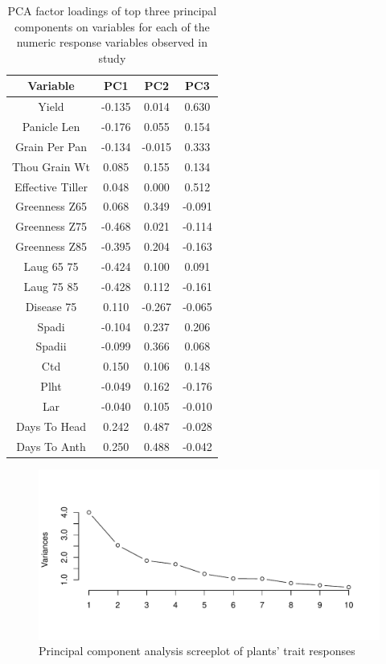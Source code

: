 \documentclass[12pt,oneside]{dukestatscithesis} %
\theoremstyle{definition}
\theoremstyle{definition}
\theoremstyle{definition}
\theoremstyle{remark}
\begin{document}
\begin{table}[H]

\caption{\label{tab:principal-component-loadings}PCA factor loadings of top three principal components on variables for each of the numeric response variables observed in study}
\centering
\fontsize{11}{13}\selectfont
\begin{tabular}[t]{cccc}
\toprule
\textbf{Variable} & \textbf{PC1} & \textbf{PC2} & \textbf{PC3}\\
\midrule
Yield & -0.135 & 0.014 & 0.630\\
Panicle Len & -0.176 & 0.055 & 0.154\\
Grain Per Pan & -0.134 & -0.015 & 0.333\\
Thou Grain Wt & 0.085 & 0.155 & 0.134\\
Effective Tiller & 0.048 & 0.000 & 0.512\\
Greenness Z65 & 0.068 & 0.349 & -0.091\\
Greenness Z75 & -0.468 & 0.021 & -0.114\\
Greenness Z85 & -0.395 & 0.204 & -0.163\\
Laug 65 75 & -0.424 & 0.100 & 0.091\\
Laug 75 85 & -0.428 & 0.112 & -0.161\\
Disease 75 & 0.110 & -0.267 & -0.065\\
Spadi & -0.104 & 0.237 & 0.206\\
Spadii & -0.099 & 0.366 & 0.068\\
Ctd & 0.150 & 0.106 & 0.148\\
Plht & -0.049 & 0.162 & -0.176\\
Lar & -0.040 & 0.105 & -0.010\\
Days To Head & 0.242 & 0.487 & -0.028\\
Days To Anth & 0.250 & 0.488 & -0.042\\
\bottomrule
\end{tabular}
\end{table}
\begin{figure}

{\centering \includegraphics[width=0.80\linewidth]{thesis_files/figure-latex/screeplot-1} 

}

\caption{Principal component analysis screeplot of plants' trait responses}\label{fig:screeplot}
\end{figure}
\end{document}
